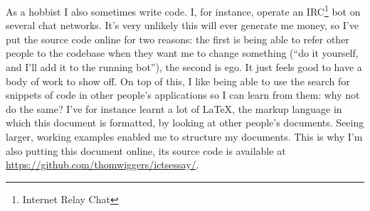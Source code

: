 \documentclass{article}
\begin{document}
As a hobbist I also sometimes write code. I, for instance, operate an
IRC\footnote{Internet Relay Chat} bot on several chat networks. It's very
unlikely this will ever generate me money, so I've put the source code online
for two reasons: the first is being able to refer other people to the codebase
when they want me to change something (``do it yourself, and I'll add it to the
running bot''), the second is ego. It just feels good to have a body of work to
show off. On top of this, I like being able to use the search for snippets of
code in other people's applications so I can learn from them: why not do the
same? I've for instance learnt a lot of \LaTeX, the markup language in which
this document is formatted, by looking at other people's documents. Seeing
larger, working examples enabled me to structure my documents. This is why I'm
also putting this document online, its source code is available at
\url{https://github.com/thomwiggers/ictsessay/}.

\printbibliography 
\end{document}
